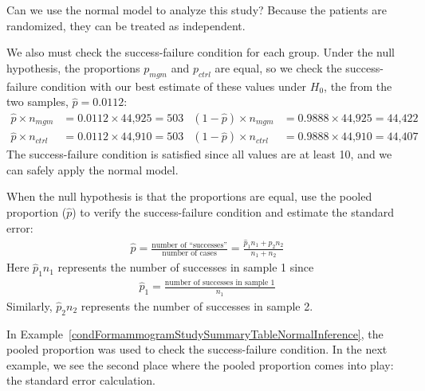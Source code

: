 \begin{example}{Can we use the normal model to analyze this study?}\label{condFormammogramStudySummaryTableNormalInference}
Because the patients are randomized, they can be treated as independent.

We also must check the success-failure condition for each group. Under the null hypothesis, the proportions $p_{mgm}$ and $p_{ctrl}$ are equal, so we check the success-failure condition with our best estimate of these values under $H_0$, the  from the two samples, $\hat{p} = 0.0112$:
\begin{align*}
\hat{p} \times n_{mgm} &= 0.0112 \times \text{44,925} = 503
	& (1 - \hat{p}) \times n_{mgm} &= 0.9888 \times \text{44,925} = \text{44,422} \\
\hat{p} \times n_{ctrl} &= 0.0112 \times \text{44,910} = 503
	& (1 - \hat{p}) \times n_{ctrl} &= 0.9888 \times \text{44,910} = \text{44,407}
\end{align*}
The success-failure condition is satisfied since all values are at least 10, and we can safely apply the normal model.
\end{example}

\begin{termBox}{
When the null hypothesis is that the proportions are equal, use the pooled proportion ($\hat{p}$) to verify the success-failure condition and estimate the standard error:
\begin{eqnarray*}
\hat{p} = \frac{\text{number of ``successes''}}{\text{number of cases}} = \frac{\hat{p}_1n_1 + \hat{p}_2n_2}{n_1 + n_2}
\end{eqnarray*}
Here $\hat{p}_1n_1$ represents the number of successes in sample 1 since
\begin{eqnarray*}
\hat{p}_1 = \frac{\text{number of successes in sample 1}}{n_1}
\end{eqnarray*}
Similarly, $\hat{p}_2n_2$ represents the number of successes in sample 2.}
\end{termBox}

In Example~\ref{condFormammogramStudySummaryTableNormalInference}, the pooled proportion was used to check the success-failure condition. In the next example, we see the second place where the pooled proportion comes into play: the standard error calculation.


